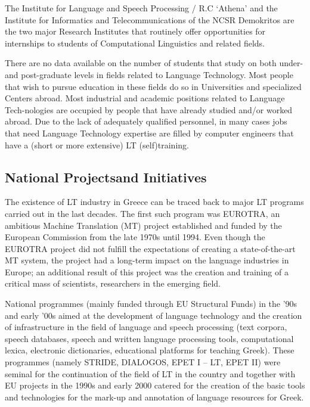\documentclass[]{../../metanetpaper}
\begin{document}
\begin{multicols}{2}
The Institute for Language and Speech Processing / R.C ‘Athena’ and the Institute for Informatics and Telecommunications of the NCSR Demokritos are the two major Research Institutes that routinely offer opportunities for internships to students of Computational Linguistics and related fields.

There are no data available on the number of students that study on both under- and post-graduate levels in fields related to Language Technology. Most people that wish to pursue education in these fields do so in Universities and specialized Centers abroad. Most industrial and academic positions related to Language Tech-nologies are occupied by people that have already studied and/or worked abroad. Due to the lack of adequately qualified personnel, in many cases jobs that need Language Technology expertise are filled by computer engineers that have a (short or more extensive) LT (self)training.

\subsection[National Projects and Initiatives]{National Projects\newline and Initiatives}

The existence of LT industry in Greece can be traced back to major LT programs carried out in the last decades. The first such program was EUROTRA, an ambitious Machine Translation (MT) project established and funded by the European Commission from the late 1970s until 1994. Even though the EUROTRA project did not fulfill the expectations of creating a state-of-the-art MT system, the project had a long-term impact on the language industries in Europe; an additional result of this project was the creation and training of a critical mass of scientists, researchers in the emerging field. 

National programmes (mainly funded through EU Structural Funds) in the '90s and early '00s aimed at the development of language technology and the creation of infrastructure in the field of language and speech processing (text corpora, speech databases, speech and written language processing tools, computational lexica, electronic dictionaries, educational platforms for teaching Greek). These programmes (namely STRIDE, DIALOGOS, EPET I – LT, EPET II) were seminal for the continuation of the field of LT in the country and together with EU projects in the 1990s and early 2000 catered for the creation of the basic tools and technologies for the mark-up and annotation of language resources for Greek.


\end{multicols}
\end{document}
